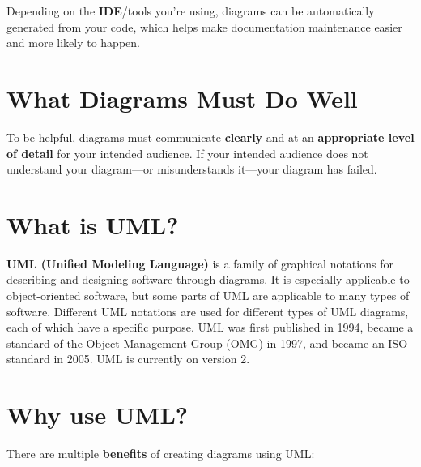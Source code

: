 Depending on the \textbf{IDE}\marginpar{\ideDef}/tools you're using, diagrams can be automatically generated from your code, which helps make documentation maintenance easier and  more likely to happen.

\section{What Diagrams Must Do Well}
To be helpful, diagrams must communicate \textbf{clearly} and at an \textbf{appropriate level of detail} for your intended audience. If your intended audience does not understand your diagram---or misunderstands it---your diagram has failed.

\section{What is UML?}

\textbf{UML (Unified Modeling Language)}\marginpar{\umlDef} is a family of graphical notations for describing and designing software through diagrams. It is especially applicable to object-oriented software, but some parts of UML are applicable to many types of software. Different UML notations are used for different types of UML diagrams, each of which have a specific purpose. UML was first published in 1994, became a standard of the Object Management Group (OMG) in 1997, and became an ISO standard in 2005. UML is currently on version 2.

\section{Why use UML?}

There are multiple \textbf{benefits} of creating diagrams using UML:\\


